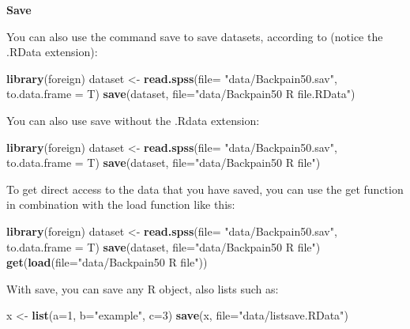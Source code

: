 \documentclass[
]{book}
\newenvironment{Shaded}{\begin{snugshade}}{\end{snugshade}}
\newcommand{\DataTypeTok}[1]{\textcolor[rgb]{0.13,0.29,0.53}{#1}}
\newcommand{\DecValTok}[1]{\textcolor[rgb]{0.00,0.00,0.81}{#1}}
\newcommand{\KeywordTok}[1]{\textcolor[rgb]{0.13,0.29,0.53}{\textbf{#1}}}
\newcommand{\NormalTok}[1]{#1}
\newcommand{\StringTok}[1]{\textcolor[rgb]{0.31,0.60,0.02}{#1}}
\begin{document}
\textbf{Save}

You can also use the command save to save datasets, according to (notice the .RData extension):

\begin{Shaded}
\begin{Highlighting}[]
\KeywordTok{library}\NormalTok{(foreign)}
\NormalTok{dataset <-}\StringTok{ }\KeywordTok{read.spss}\NormalTok{(}\DataTypeTok{file=} \StringTok{"data/Backpain50.sav"}\NormalTok{, }\DataTypeTok{to.data.frame =}\NormalTok{ T)}
\KeywordTok{save}\NormalTok{(dataset, }\DataTypeTok{file=}\StringTok{"data/Backpain50 R file.RData"}\NormalTok{)}
\end{Highlighting}
\end{Shaded}

You can also use save without the .Rdata extension:

\begin{Shaded}
\begin{Highlighting}[]
\KeywordTok{library}\NormalTok{(foreign)}
\NormalTok{dataset <-}\StringTok{ }\KeywordTok{read.spss}\NormalTok{(}\DataTypeTok{file=} \StringTok{"data/Backpain50.sav"}\NormalTok{, }\DataTypeTok{to.data.frame =}\NormalTok{ T)}
\KeywordTok{save}\NormalTok{(dataset, }\DataTypeTok{file=}\StringTok{"data/Backpain50 R file"}\NormalTok{)}
\end{Highlighting}
\end{Shaded}

To get direct access to the data that you have saved, you can use the get function in combination with the load function like this:

\begin{Shaded}
\begin{Highlighting}[]
\KeywordTok{library}\NormalTok{(foreign)}
\NormalTok{dataset <-}\StringTok{ }\KeywordTok{read.spss}\NormalTok{(}\DataTypeTok{file=} \StringTok{"data/Backpain50.sav"}\NormalTok{, }\DataTypeTok{to.data.frame =}\NormalTok{ T)}
\KeywordTok{save}\NormalTok{(dataset, }\DataTypeTok{file=}\StringTok{"data/Backpain50 R file"}\NormalTok{)}
\KeywordTok{get}\NormalTok{(}\KeywordTok{load}\NormalTok{(}\DataTypeTok{file=}\StringTok{"data/Backpain50 R file"}\NormalTok{))}
\end{Highlighting}
\end{Shaded}

With save, you can save any R object, also lists such as:

\begin{Shaded}
\begin{Highlighting}[]
\NormalTok{x <-}\StringTok{ }\KeywordTok{list}\NormalTok{(}\DataTypeTok{a=}\DecValTok{1}\NormalTok{, }\DataTypeTok{b=}\StringTok{"example"}\NormalTok{, }\DataTypeTok{c=}\DecValTok{3}\NormalTok{)}
\KeywordTok{save}\NormalTok{(x, }\DataTypeTok{file=}\StringTok{"data/listsave.RData"}\NormalTok{)}
\end{Highlighting}
\end{Shaded}
\end{document}
